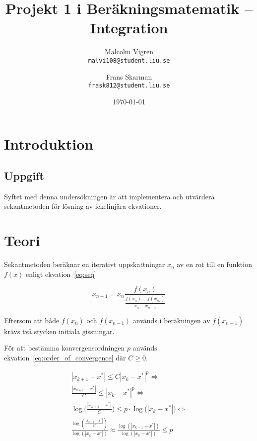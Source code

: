 \documentclass[a4paper,titlepage]{article}
\title{
    \textbf{Projekt 1 i Beräkningsmatematik -- Integration }}
\date{\today}
\author{%
    Malcolm Vigren \\
    \texttt{malvi108@student.liu.se}
    \and
    Frans Skarman\\
    \texttt{frask812@student.liu.se}
    }
\begin{document}
\maketitle
\newpage
\tableofcontents
\newpage

\section{Introduktion}

\subsection{Uppgift}

Syftet med denna undersökningen är att implementera och utvärdera sekantmetoden
för lösning av ickelinjära ekvationer.


\section{Teori}

Sekantmetoden beräknar en iterativt uppskattningar $x_n$ av en rot till en
funktion $f(x)$ enligt ekvation~\ref{eq:seq}

\begin{equation}
    \label{eq:seq}
    x_{n+1} = x_{n}
    \frac{f(x_n)}
        {\frac{f(x_n) - f(x_{n_1})}
                {x_n - x_{n-1}}
        }
\end{equation}

Eftersom att både $f(x_n)$ och $f(x_{n-1})$ används i beräkningen av $f(x_{n+1})$ krävs
två stycken initiala gissningar.


För att bestämma konvergensordningen $p$ används ekvation~\ref{eq:order_of_convergence} där
$C \geq 0$.

\begin{equation}
    \begin{gathered}
        |x_{k+1} - x^*| \leq C |x_k - x^*|^p \Leftrightarrow \\
        \frac{|x_{k+1} - x^*|}{C} \leq |x_{k} - x^*|^p \Leftrightarrow \\
        \log\big(\frac{|x_{k+1} - x^*|}{C} \big) \leq
            p \cdot \log\big(|x_{k} - x^*|\big) \Leftrightarrow \\
        \frac{\log(\frac{|x_{k+1} - x^*|}{C})}
            {\log(|x_{k} - x^*|)}
        \approx \frac{\log(|x_{k+1} - x^*|)}
            {\log(|x_{k} - x^*|)} \leq p \\
    \end{gathered}
    \label{eq:order_of_convergence}
\end{equation}
\end{document}
